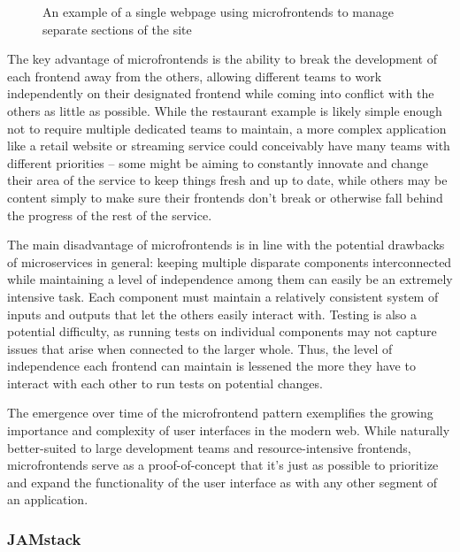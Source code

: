 \begin{figure}[!ht]
	\begin{center}
		\caption{An example of a single webpage using microfrontends to manage separate sections of the site}\label{microex}
	\end{center}
\end{figure}

The key advantage of microfrontends is the ability to break the development of each frontend away from the others, allowing different teams to work independently on their designated frontend while coming into conflict with the others as little as possible. While the restaurant example is likely simple enough not to require multiple dedicated teams to maintain, a more complex application like a retail website or streaming service could conceivably have many teams with different priorities -- some might be aiming to constantly innovate and change their area of the service to keep things fresh and up to date, while others may be content simply to make sure their frontends don't break or otherwise fall behind the progress of the rest of the service.

The main disadvantage of microfrontends is in line with the potential drawbacks of microservices in general: keeping multiple disparate components interconnected while maintaining a level of independence among them can easily be an extremely intensive task. Each component must maintain a relatively consistent system of inputs and outputs that let the others easily interact with. Testing is also a potential difficulty, as running tests on individual components may not capture issues that arise when connected to the larger whole. Thus, the level of independence each frontend can maintain is lessened the more they have to interact with each other to run tests on potential changes.

The emergence over time of the microfrontend pattern exemplifies the growing importance and complexity of user interfaces in the modern web. While naturally better-suited to large development teams and resource-intensive frontends, microfrontends serve as a proof-of-concept that it's just as possible to prioritize and expand the functionality of the user interface as with any other segment of an application.

\subsubsection{JAMstack}

